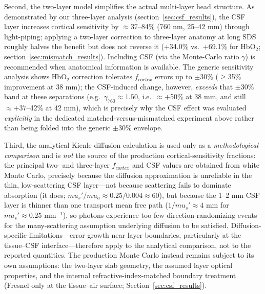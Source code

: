 \documentclass[11pt]{article}
\def\mu{mu}%
\def\mathrm#1{#1}%
\def\,{ }%
\begin{document}
Second, the two-layer model simplifies the actual multi-layer head structure. As demonstrated by our three-layer analysis (section~\ref{sec:csf_results}), the CSF layer increases cortical sensitivity by $\approx$37--84\% (760\,nm, 25--42\,mm) through light-piping; applying a two-layer correction to three-layer anatomy at long SDS roughly halves the benefit but does not reverse it ($+$34.0\% vs.\ $+$69.1\% for HbO$_2$; section~\ref{sec:mismatch_results}). Including CSF (via the Monte-Carlo ratio $\gamma$) is recommended when anatomical information is available. The generic sensitivity analysis shows HbO$_2$ correction tolerates $f_{\mathrm{cortex}}$ errors up to $\pm$30\% ($\geq$35\% improvement at 38\,mm); the CSF-induced change, however, \emph{exceeds} that $\pm$30\% band at these separations (e.g.\ $\gamma_{760}\approx1.50$, i.e.\ $\approx+$50\% at 38\,mm, and still $\approx+$37--42\% at 42\,mm), which is precisely why the CSF effect was evaluated \emph{explicitly} in the dedicated matched-versus-mismatched experiment above rather than being folded into the generic $\pm$30\% envelope.

Third, the analytical Kienle diffusion calculation is used only as a \emph{methodological comparison} and is \emph{not} the source of the production cortical-sensitivity fractions: the principal two- and three-layer $f_{\mathrm{cortex}}$ and CSF values are obtained from white Monte Carlo, precisely because the diffusion approximation is unreliable in the thin, low-scattering CSF layer---not because scattering fails to dominate absorption (it does; $\mu_s'/\mu_a\approx0.25/0.004\approx60$), but because the 1--2\,mm CSF layer is thinner than one transport mean free path ($1/\mu_s'\approx4$\,mm for $\mu_s'\approx0.25$\,mm$^{-1}$), so photons experience too few direction-randomizing events for the many-scattering assumption underlying diffusion to be satisfied. Diffusion-specific limitations---error growth near layer boundaries, particularly at the tissue--CSF interface\cite{r12,r39}---therefore apply to the analytical comparison, not to the reported quantities. The production Monte Carlo instead remains subject to its own assumptions: the two-layer slab geometry, the assumed layer optical properties, and the internal refractive-index-matched boundary treatment (Fresnel only at the tissue--air surface; Section~\ref{sec:csf_results}).
\end{document}
